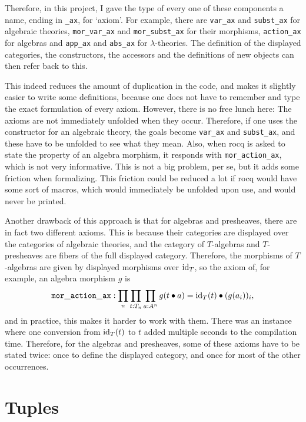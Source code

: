 Therefore, in this project, I gave the type of every one of these components a name, ending in \texttt{\_ax}, for `axiom'. For example, there are \texttt{var\_ax} and \texttt{subst\_ax} for algebraic theories, \texttt{mor\_var\_ax} and \texttt{mor\_subst\_ax} for their morphisms, \texttt{action\_ax} for algebras and \texttt{app\_ax} and \texttt{abs\_ax} for $ \lambda $-theories. The definition of the displayed categories, the constructors, the accessors and the definitions of new objects can then refer back to this.

This indeed reduces the amount of duplication in the code, and makes it slightly easier to write some definitions, because one does not have to remember and type the exact formulation of every axiom. However, there is no free lunch here: The axioms are not immediately unfolded when they occur. Therefore, if one uses the constructor for an algebraic theory, the goals become \texttt{var\_ax} and \texttt{subst\_ax}, and these have to be unfolded to see what they mean. Also, when rocq is asked to state the property of an algebra morphism, it responds with \texttt{mor\_action\_ax}, which is not very informative. This is not a big problem, per se, but it adds some friction when formalizing. This friction could be reduced a lot if rocq would have some sort of macros, which would immediately be unfolded upon use, and would never be printed.

Another drawback of this approach is that for algebras and presheaves, there are in fact two different axioms. This is because their categories are displayed over the categories of algebraic theories, and the category of $ T $-algebras and $ T $-presheaves are fibers of the full displayed category. Therefore, the morphisms of $ T $-algebras are given by displayed morphisms over $ \text{id}_{T} $, so the axiom of, for example, an algebra morphism $ g $ is
\[ \mathtt{mor\_action\_ax}: \prod_n \prod_{t : T_n} \prod_{a : A^n} g (t \bullet a) = \text{id}_{T}(t) \bullet (g (a_i))_i, \]
and in practice, this makes it harder to work with them. There was an instance where one conversion from $ \text{id}_{T}(t) $ to $ t $ added multiple seconds to the compilation time. Therefore, for the algebras and presheaves, some of these axioms have to be stated twice: once to define the displayed category, and once for most of the other occurrences.

\section{Tuples}

